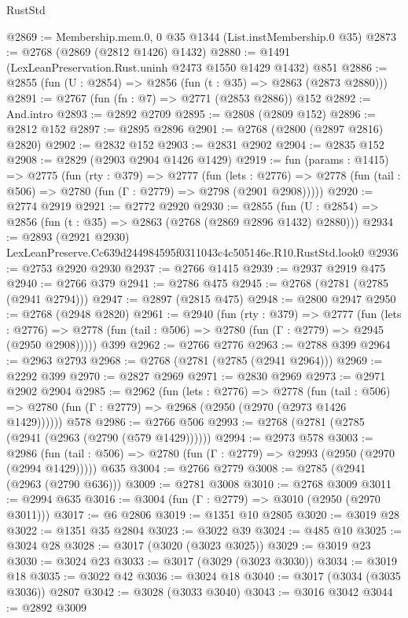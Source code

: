 \begin{lexlean}{RustStd}
\begin{coremodule}
@2869 := Membership.mem.{0, 0} @35 @1344 (List.instMembership.{0} @35)
@2873 := @2768 (@2869 (@2812 @1426) @1432)
@2880 := @1491 (LexLeanPreservation.Rust.uninh @2473 @1550 @1429 @1432) @851
@2886 := @2855 (fun (U : @2854) => @2856 (fun (t : @35) => @2863 (@2873 @2880)))
@2891 := @2767 (fun (fn : @7) => @2771 (@2853 @2886)) @152
@2892 := And.intro
@2893 := @2892 @2709
@2895 := @2808 (@2809 @152)
@2896 := @2812 @152
@2897 := @2895 @2896
@2901 := @2768 (@2800 (@2897 @2816) @2820)
@2902 := @2832 @152
@2903 := @2831 @2902
@2904 := @2835 @152
@2908 := @2829 (@2903 @2904 @1426 @1429)
@2919 := fun (params : @1415) =>
  @2775
    (fun (rty : @379) =>
    @2777
      (fun (lets : @2776) =>
      @2778 (fun (tail : @506) => @2780 (fun (Γ : @2779) => @2798 (@2901 @2908)))))
@2920 := @2774 @2919
@2921 := @2772 @2920
@2930 := @2855 (fun (U : @2854) => @2856 (fun (t : @35) => @2863 (@2768 (@2869 @2896 @1432) @2880)))
@2934 := @2893 (@2921 @2930) LexLeanPreserve.Cc639d244984595f0311043c4c505146e.R10.RustStd.look0
@2936 := @2753 @2920 @2930
@2937 := @2766 @1415
@2939 := @2937 @2919 @475
@2940 := @2766 @379
@2941 := @2786 @475
@2945 := @2768 (@2781 (@2785 (@2941 @2794)))
@2947 := @2897 (@2815 @475)
@2948 := @2800 @2947
@2950 := @2768 (@2948 @2820)
@2961 := @2940
    (fun (rty : @379) =>
    @2777
      (fun (lets : @2776) =>
      @2778 (fun (tail : @506) => @2780 (fun (Γ : @2779) => @2945 (@2950 @2908)))))
    @399
@2962 := @2766 @2776
@2963 := @2788 @399
@2964 := @2963 @2793
@2968 := @2768 (@2781 (@2785 (@2941 @2964)))
@2969 := @2292 @399
@2970 := @2827 @2969
@2971 := @2830 @2969
@2973 := @2971 @2902 @2904
@2985 := @2962
    (fun (lets : @2776) =>
    @2778
      (fun (tail : @506) => @2780 (fun (Γ : @2779) => @2968 (@2950 (@2970 (@2973 @1426 @1429))))))
    @578
@2986 := @2766 @506
@2993 := @2768 (@2781 (@2785 (@2941 (@2963 (@2790 (@579 @1429))))))
@2994 := @2973 @578
@3003 := @2986
    (fun (tail : @506) => @2780 (fun (Γ : @2779) => @2993 (@2950 (@2970 (@2994 @1429)))))
    @635
@3004 := @2766 @2779
@3008 := @2785 (@2941 (@2963 (@2790 @636)))
@3009 := @2781 @3008
@3010 := @2768 @3009
@3011 := @2994 @635
@3016 := @3004 (fun (Γ : @2779) => @3010 (@2950 (@2970 @3011)))
@3017 := @6 @2806
@3019 := @1351 @10 @2805
@3020 := @3019 @28
@3022 := @1351 @35 @2804
@3023 := @3022 @39
@3024 := @485 @10
@3025 := @3024 @28
@3028 := @3017 (@3020 (@3023 @3025))
@3029 := @3019 @23
@3030 := @3024 @23
@3033 := @3017 (@3029 (@3023 @3030))
@3034 := @3019 @18
@3035 := @3022 @42
@3036 := @3024 @18
@3040 := @3017 (@3034 (@3035 @3036)) @2807
@3042 := @3028 (@3033 @3040)
@3043 := @3016 @3042
@3044 := @2892 @3009

\end{coremodule}
\end{lexlean}
